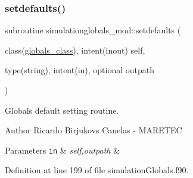 \subsubsection{\texorpdfstring{setdefaults()}{setdefaults()}}
{\footnotesize\ttfamily subroutine simulationglobals\+\_\+mod\+::setdefaults (\begin{DoxyParamCaption}\item[{class(\mbox{\hyperlink{structsimulationglobals__mod_1_1globals__class}{globals\+\_\+class}}), intent(inout)}]{self,  }\item[{type(string), intent(in), optional}]{outpath }\end{DoxyParamCaption})\hspace{0.3cm}{\ttfamily [private]}}



Globals default setting routine. 

\begin{DoxyAuthor}{Author}
Ricardo Birjukovs Canelas -\/ M\+A\+R\+E\+T\+EC 
\end{DoxyAuthor}

\begin{DoxyParams}[1]{Parameters}
\mbox{\tt in}  & {\em self,outpath} & \\
\hline
\end{DoxyParams}


Definition at line 199 of file simulation\+Globals.\+f90.


